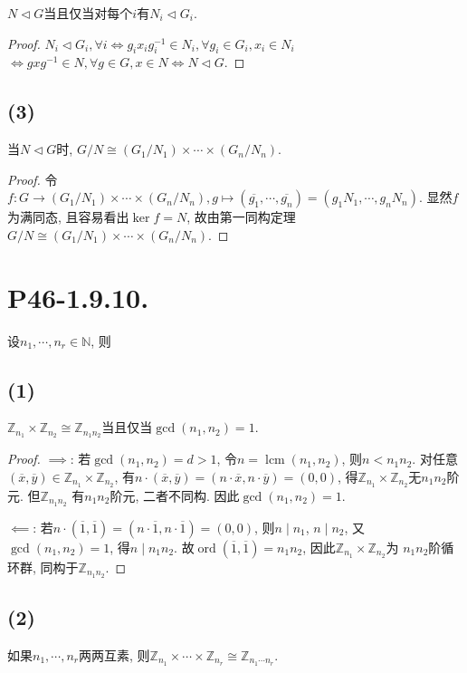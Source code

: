 \documentclass[12pt, a4paper, fontset=windows]{ctexart}
\newcommand{\N}{\mathbb{N}}
\newcommand{\Z}{\mathbb{Z}}
\newcommand{\cl}[1]{\overline{#1}} %
\newcommand{\isom}{\cong} %
\newcommand{\lcm}{\operatorname{lcm}}
\newcommand{\ord}{\operatorname{ord}}
\newcommand{\timess}{\times\cdots\times}
\begin{document}
$N\lhd G$当且仅当对每个$i$有$N_i\lhd G_i$. 

\begin{proof}
$N_i\lhd G_i,\forall i\iff g_ix_ig_i^{-1}\in N_i,
\forall g_i\in G_i,x_i\in N_i$
$\iff gxg^{-1}\in N,\forall g\in G,x\in N\iff N\lhd G$. 
\end{proof}

\subsection*{(3)}

当$N\lhd G$时, $G/N\isom(G_1/N_1)\timess(G_n/N_n)$. 

\begin{proof}
令$f:G\to (G_1/N_1)\timess(G_n/N_n),g\mapsto(\cl{g_1},\cdots,\cl{g_n})=(g_1N_1,\cdots,g_nN_n)$. 
显然$f$为满同态, 且容易看出$\ker f=N$, 故由第一同构定理
$G/N\isom(G_1/N_1)\timess(G_n/N_n)$. 
\end{proof}

\section*{P46-1.9.10.}

设$n_1,\cdots,n_r\in\N$, 则

\subsection*{(1)}

$\Z_{n_1}\times\Z_{n_2}\isom\Z_{n_1n_2}$当且仅当$\gcd(n_1,n_2)=1$. 

\begin{proof}
$\implies$: 若$\gcd(n_1,n_2)=d>1$, 令$n=\lcm(n_1,n_2)$, 则$n<n_1n_2$. 
对任意$(\cl{x},\cl{y})\in\Z_{n_1}\times\Z_{n_2}$, 
有$n\cdot(\cl{x},\cl{y})=(n\cdot\cl{x},n\cdot\cl{y})=(0,0)$, 
得$\Z_{n_1}\times\Z_{n_2}$无$n_1n_2$阶元. 但$\Z_{n_1n_2}$
有$n_1n_2$阶元, 二者不同构. 因此$\gcd(n_1,n_2)=1$. 

$\impliedby$: 若$n\cdot(\cl{1},\cl{1})=(n\cdot\cl{1},n\cdot\cl{1})=(0,0)$, 
则$n\mid n_1$, $n\mid n_2$, 又$\gcd(n_1,n_2)=1$, 得$n\mid n_1n_2$. 
故$\ord(\cl{1},\cl{1})=n_1n_2$, 因此$\Z_{n_1}\times\Z_{n_2}$为
$n_1n_2$阶循环群, 同构于$\Z_{n_1n_2}$. 
\end{proof}

\subsection*{(2)}

如果$n_1,\cdots,n_r$两两互素, 则$\Z_{n_1}\timess\Z_{n_r}\isom\Z_{n_1\cdots n_r}$. 
\end{document}
